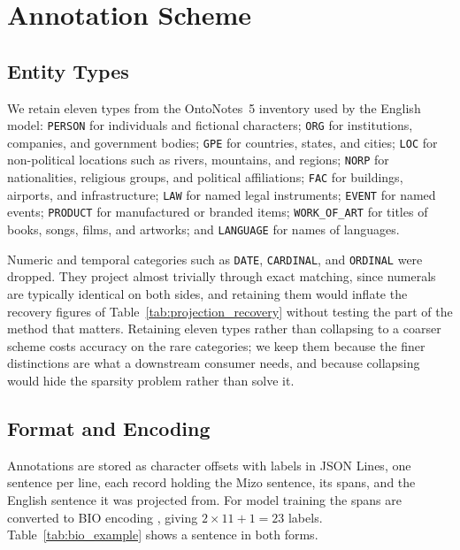 \documentclass[acmsmall,screen,review]{acmart}
\begin{document}
\section{Annotation Scheme}
\label{sec:tagset}

\subsection{Entity Types}
\label{sec:tagset:types}

We retain eleven types from the OntoNotes~5 inventory used by the English model:
\texttt{PERSON} for individuals and fictional characters; \texttt{ORG} for
institutions, companies, and government bodies; \texttt{GPE} for countries,
states, and cities; \texttt{LOC} for non-political locations such as rivers,
mountains, and regions; \texttt{NORP} for nationalities, religious groups, and
political affiliations; \texttt{FAC} for buildings, airports, and
infrastructure; \texttt{LAW} for named legal instruments; \texttt{EVENT} for
named events; \texttt{PRODUCT} for manufactured or branded items;
\texttt{WORK\_OF\_ART} for titles of books, songs, films, and artworks; and
\texttt{LANGUAGE} for names of languages.

Numeric and temporal categories such as \texttt{DATE}, \texttt{CARDINAL}, and
\texttt{ORDINAL} were dropped. They project almost trivially through exact
matching, since numerals are typically identical on both sides, and retaining
them would inflate the recovery figures of
Table~\ref{tab:projection_recovery} without testing the part of the method that
matters. Retaining eleven types rather than collapsing to a coarser scheme costs
accuracy on the rare categories; we keep them because the finer distinctions are
what a downstream consumer needs, and because collapsing would hide the sparsity
problem rather than solve it.

\subsection{Format and Encoding}
\label{sec:tagset:format}

Annotations are stored as character offsets with labels in JSON Lines, one
sentence per line, each record holding the Mizo sentence, its spans, and the
English sentence it was projected from. For model training the spans are
converted to BIO encoding \citep{ramshaw1995chunking}, giving
$2 \times 11 + 1 = 23$ labels. Table~\ref{tab:bio_example} shows a sentence in
both forms.
\end{document}
